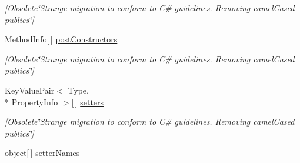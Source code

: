 \begin{DoxyCompactItemize}
\begin{DoxyCompactList}\small\item\em \mbox{[}Obsolete\char`\"{}\-Strange migration to conform to C\# guidelines. Removing camel\-Cased publics\char`\"{}\mbox{]} \end{DoxyCompactList}\item 
\hypertarget{interfacestrange_1_1extensions_1_1reflector_1_1api_1_1_i_reflected_class_a23705414bd05de366f28b60df085e0b3}{Method\-Info\mbox{[}$\,$\mbox{]} \hyperlink{interfacestrange_1_1extensions_1_1reflector_1_1api_1_1_i_reflected_class_a23705414bd05de366f28b60df085e0b3}{post\-Constructors}}\label{interfacestrange_1_1extensions_1_1reflector_1_1api_1_1_i_reflected_class_a23705414bd05de366f28b60df085e0b3}

\begin{DoxyCompactList}\small\item\em \mbox{[}Obsolete\char`\"{}\-Strange migration to conform to C\# guidelines. Removing camel\-Cased publics\char`\"{}\mbox{]} \end{DoxyCompactList}\item 
\hypertarget{interfacestrange_1_1extensions_1_1reflector_1_1api_1_1_i_reflected_class_a27d795a13a05ebde2bf9efebd00e75cc}{Key\-Value\-Pair$<$ Type, \\*
Property\-Info $>$\mbox{[}$\,$\mbox{]} \hyperlink{interfacestrange_1_1extensions_1_1reflector_1_1api_1_1_i_reflected_class_a27d795a13a05ebde2bf9efebd00e75cc}{setters}}\label{interfacestrange_1_1extensions_1_1reflector_1_1api_1_1_i_reflected_class_a27d795a13a05ebde2bf9efebd00e75cc}

\begin{DoxyCompactList}\small\item\em \mbox{[}Obsolete\char`\"{}\-Strange migration to conform to C\# guidelines. Removing camel\-Cased publics\char`\"{}\mbox{]} \end{DoxyCompactList}\item 
\hypertarget{interfacestrange_1_1extensions_1_1reflector_1_1api_1_1_i_reflected_class_a7ff9cc32caeccf473c338a0e69378c94}{object\mbox{[}$\,$\mbox{]} \hyperlink{interfacestrange_1_1extensions_1_1reflector_1_1api_1_1_i_reflected_class_a7ff9cc32caeccf473c338a0e69378c94}{setter\-Names}}\label{interfacestrange_1_1extensions_1_1reflector_1_1api_1_1_i_reflected_class_a7ff9cc32caeccf473c338a0e69378c94}


\end{DoxyCompactItemize}
